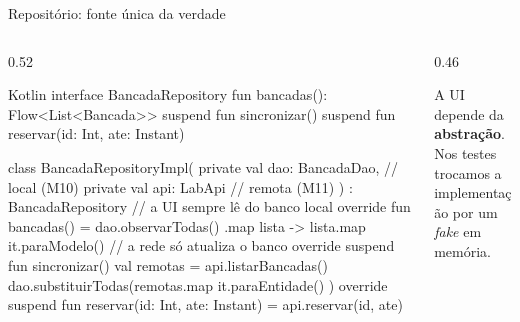 \documentclass[aspectratio=169,10pt]{beamer}
\begin{document}
\begin{frame}[fragile]{Repositório: fonte única da verdade}
  \begin{columns}[T]
    \begin{column}{0.52\textwidth}
\begin{codigo}[title=BancadaRepository.kt]{Kotlin}
interface BancadaRepository {
  fun bancadas(): Flow<List<Bancada>>
  suspend fun sincronizar()
  suspend fun reservar(id: Int, ate: Instant)
}

class BancadaRepositoryImpl(
  private val dao: BancadaDao,        // local (M10)
  private val api: LabApi             // remota (M11)
) : BancadaRepository {
  // a UI sempre lê do banco local
  override fun bancadas() = dao.observarTodas()
    .map { lista -> lista.map { it.paraModelo() } }
  // a rede só atualiza o banco
  override suspend fun sincronizar() {
    val remotas = api.listarBancadas()
    dao.substituirTodas(remotas.map { it.paraEntidade() })
  }
  override suspend fun reservar(id: Int, ate: Instant) =
    api.reservar(id, ate)
}
\end{codigo}
    \end{column}
    \begin{column}{0.46\textwidth}
      \centering
      \begin{conceito}
        A UI depende da \textbf{abstração}. Nos testes trocamos a implementação por um \emph{fake} em memória.
      \end{conceito}
    \end{column}
  \end{columns}
\end{frame}
\end{document}
